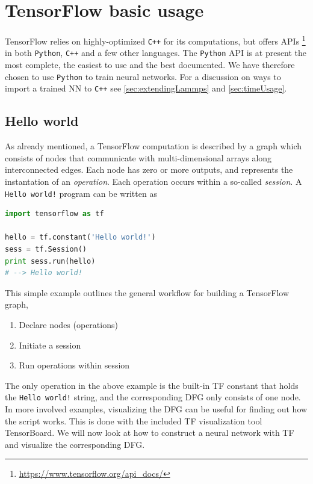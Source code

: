 \documentclass[twoside,english]{uiofysmaster}
\begin{document}
\section{TensorFlow basic usage} \label{sec:TensorFlowBasic}
TensorFlow relies on highly-optimized
\texttt{C++} for its computations, but offers
APIs \footnote{\href{https://www.tensorflow.org/api_docs/}
{https://www.tensorflow.org/api\_docs/}}
in both \texttt{Python},
\texttt{C++} and a few other languages. 
The \texttt{Python} API is at present the most
complete, the easiest to use and the best documented.
We have therefore chosen to use \texttt{Python}
to train neural networks. For a discussion
on ways to import a trained NN to \texttt{C++} see
\autoref{sec:extendingLammps}
and \autoref{sec:timeUsage}. 

\subsection{Hello world}
As already mentioned, a TensorFlow computation
is described by a graph which consists of nodes
that communicate with multi-dimensional arrays along
interconnected edges. Each node has zero or more
outputs, and represents the instantation
of an \textit{operation}. Each operation
occurs within a so-called \textit{session}. 
A \texttt{Hello world!} program can be written as
\begin{lstlisting}[language=python]
import tensorflow as tf

hello = tf.constant('Hello world!')
sess = tf.Session()
print sess.run(hello)
# --> Hello world!
\end{lstlisting}
This simple example outlines the general
workflow for building a TensorFlow graph,
\begin{enumerate}
 \item Declare nodes (operations)
 \item Initiate a session
 \item Run operations within session
\end{enumerate}
The only operation in the above example
is the built-in TF constant that holds the 
\texttt{Hello world!} string, and the 
corresponding DFG only consists of one node. 
In more involved examples, visualizing 
the DFG can be useful for finding out how 
the script works. This is done with the 
included TF visualization tool TensorBoard.
We will now look at how to construct a neural network with TF and
visualize the corresponding DFG. 
\end{document}
